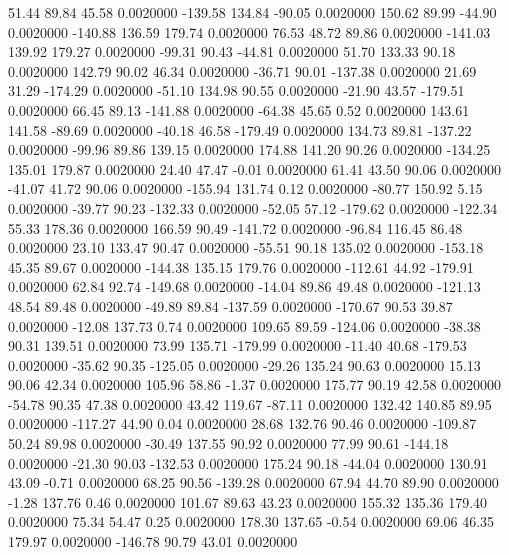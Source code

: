    51.44   89.84   45.58   0.0020000
 -139.58  134.84  -90.05   0.0020000
  150.62   89.99  -44.90   0.0020000
 -140.88  136.59  179.74   0.0020000
   76.53   48.72   89.86   0.0020000
 -141.03  139.92  179.27   0.0020000
  -99.31   90.43  -44.81   0.0020000
   51.70  133.33   90.18   0.0020000
  142.79   90.02   46.34   0.0020000
  -36.71   90.01 -137.38   0.0020000
   21.69   31.29 -174.29   0.0020000
  -51.10  134.98   90.55   0.0020000
  -21.90   43.57 -179.51   0.0020000
   66.45   89.13 -141.88   0.0020000
  -64.38   45.65    0.52   0.0020000
  143.61  141.58  -89.69   0.0020000
  -40.18   46.58 -179.49   0.0020000
  134.73   89.81 -137.22   0.0020000
  -99.96   89.86  139.15   0.0020000
  174.88  141.20   90.26   0.0020000
 -134.25  135.01  179.87   0.0020000
   24.40   47.47   -0.01   0.0020000
   61.41   43.50   90.06   0.0020000
  -41.07   41.72   90.06   0.0020000
 -155.94  131.74    0.12   0.0020000
  -80.77  150.92    5.15   0.0020000
  -39.77   90.23 -132.33   0.0020000
  -52.05   57.12 -179.62   0.0020000
 -122.34   55.33  178.36   0.0020000
  166.59   90.49 -141.72   0.0020000
  -96.84  116.45   86.48   0.0020000
   23.10  133.47   90.47   0.0020000
  -55.51   90.18  135.02   0.0020000
 -153.18   45.35   89.67   0.0020000
 -144.38  135.15  179.76   0.0020000
 -112.61   44.92 -179.91   0.0020000
   62.84   92.74 -149.68   0.0020000
  -14.04   89.86   49.48   0.0020000
 -121.13   48.54   89.48   0.0020000
  -49.89   89.84 -137.59   0.0020000
 -170.67   90.53   39.87   0.0020000
  -12.08  137.73    0.74   0.0020000
  109.65   89.59 -124.06   0.0020000
  -38.38   90.31  139.51   0.0020000
   73.99  135.71 -179.99   0.0020000
  -11.40   40.68 -179.53   0.0020000
  -35.62   90.35 -125.05   0.0020000
  -29.26  135.24   90.63   0.0020000
   15.13   90.06   42.34   0.0020000
  105.96   58.86   -1.37   0.0020000
  175.77   90.19   42.58   0.0020000
  -54.78   90.35   47.38   0.0020000
   43.42  119.67  -87.11   0.0020000
  132.42  140.85   89.95   0.0020000
 -117.27   44.90    0.04   0.0020000
   28.68  132.76   90.46   0.0020000
 -109.87   50.24   89.98   0.0020000
  -30.49  137.55   90.92   0.0020000
   77.99   90.61 -144.18   0.0020000
  -21.30   90.03 -132.53   0.0020000
  175.24   90.18  -44.04   0.0020000
  130.91   43.09   -0.71   0.0020000
   68.25   90.56 -139.28   0.0020000
   67.94   44.70   89.90   0.0020000
   -1.28  137.76    0.46   0.0020000
  101.67   89.63   43.23   0.0020000
  155.32  135.36  179.40   0.0020000
   75.34   54.47    0.25   0.0020000
  178.30  137.65   -0.54   0.0020000
   69.06   46.35  179.97   0.0020000
 -146.78   90.79   43.01   0.0020000
